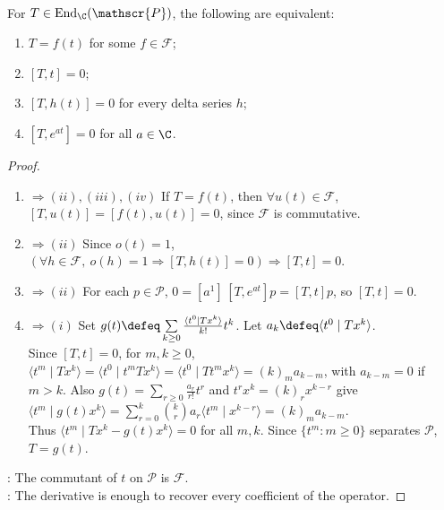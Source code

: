 \begin{theorem} \label{thm:formal-series-operators-commutant-characterization} \\
For $T\in\operatorname{End}_{\C}(\mathscr{P})$, the following are equivalent:
\begin{enumerate}[label=(\roman*)]
\setlength{\itemsep}{0pt}
\item $T=f(t)$ for some $f\in\mathscr{F}$;
\item $[T,t]=0$;
\item $[T,h(t)]=0$ for every delta series $h$;
\item $[T,e^{at}]=0$ for all $a\in\C$.
\end{enumerate}
\begin{proof}
\begin{enumerate}[label=(\roman*).]
\setlength{\itemsep}{0pt}
\item[$(i)$]$\Rightarrow (ii),(iii),(iv)$ If $T=f(t)$, then $\forall u(t)\in\mathscr{F}$, $[T,u(t)]=[f(t),u(t)]=0$, since $\mathscr{F}$ is commutative.
\item[$(iii)$]$\Rightarrow (ii)$ Since $o(t)=1$, $(\forall h\in\mathscr{F},\ o(h)=1\Rightarrow [T,h(t)]=0) \Rightarrow [T,t]=0$.
\item[$(iv)$]$\Rightarrow (ii)$ For each $p\in\mathscr{P}$, $0=[a^1]\,[T,e^{at}]p=[T,t]p$, so $[T,t]=0$.
\item[$(ii)$]$\Rightarrow (i)$ Set $g(t)\defeq\sum\limits_{k\geq0}\frac{\langle t^0\mid Tx^k\rangle}{k!}t^k$. Let $a_k\defeq\langle t^0\mid Tx^k\rangle$.\\
Since $[T,t]=0$, for $m,k\geq0$, $\langle t^m\mid Tx^k\rangle =\langle t^0\mid t^mTx^k\rangle =\langle t^0\mid Tt^mx^k\rangle =(k)_m a_{k-m}$, with $a_{k-m}=0$ if $m>k$. Also $g(t)=\sum\limits_{r\geq0}\frac{a_r}{r!}t^r$ and $t^rx^k=(k)_rx^{k-r}$ give $\langle t^m\mid g(t)x^k\rangle=\sum\limits_{r=0}^{k}\binom{k}{r}a_r\langle t^m\mid x^{k-r}\rangle=(k)_m a_{k-m}$.\\
Thus $\langle t^m\mid Tx^k-g(t)x^k\rangle=0$ for all $m,k$. Since $\{t^m:m\geq0\}$ separates $\mathscr{P}$, $T=g(t)$.
\end{enumerate}
: The commutant of $t$ on $\mathscr{P}$ is $\mathscr{F}$.\\
: The derivative is enough to recover every coefficient of the operator.
\end{proof}
\end{theorem}

